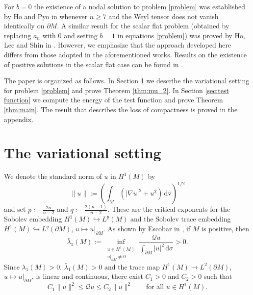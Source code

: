 \documentclass[reqno,11pt,oneside]{amsart}
\numberwithin{equation}{section}
\def\im{\int_{M}}
\def\idm{\int_{\partial M}}
\def\d{\,\mathrm{d}}
\def\dv{\,\mathrm{dv}}
\begin{document}
For $b=0$ the existence of a nodal solution to problem \eqref{problem} was established by Ho and Pyo in \cite[Theorems 1.3,  1.5 and 1.6]{hp} whenever $n\geq 7$ and the Weyl tensor does not vanish identically on $\partial M$. A similar result for the scalar flat problem (obtained by replacing $a_n$ with $0$ and setting $b=1$ in equations \eqref{problem}) was proved by Ho, Lee and Shin in \cite[Theorems 3.1, 5.2 and 6.1]{hls}. However, we emphasize that the approach developed here differs from those adopted in the aforementioned works. Results on the existence of positive solutions in the scalar flat case can be found in \cite{e2,mn}.

The paper is organized as follows. In Section \ref{sec:setting} we describe the variational setting for problem \eqref{problem} and prove Theorem \ref{thm:mu_2}. In Section \ref{sec:test function} we compute the energy of the test function and prove Theorem \ref{thm:main}. The result that describes the loss of compactness is proved in the appendix.

\section{The variational setting}
\label{sec:setting}

We denote the standard norm of $u$ in $H^1(M)$ by
$$\|u\|:=\left(\im(|\nabla u|^2+u^2)\dv\right)^{1/2}$$
and set $p:=\frac{2n}{n-2}$ and $q:=\frac{2(n-1)}{n-2}$. These are the critical exponents for the Sobolev embedding $H^1(M)\hookrightarrow L^p(M)$ and the Sobolev trace embedding $H^1(M)\hookrightarrow L^q(\partial M)$, $u\mapsto u|_{\partial M}$. As shown by Escobar in \cite[Section 1]{e2}, if $M$ is positive, then
\begin{equation}\label{eq:escobar1}
\bar{\lambda}_1(M):=\inf_{\substack{u\in H^1(M) \\ u|_{\partial M}\neq 0}}\frac{\mathscr{Q}u}{\idm |u|^2\d \sigma}>0.
\end{equation}
Since $\lambda_1(M)>0$, $\bar{\lambda}_1(M)>0$ and the trace map $H^1(M)\to L^2(\partial M)$, $u\mapsto u|_{\partial M}$, is linear and continuous, there exist $C_1>0$ and $C_2>0$ such that
\begin{equation} \label{eq:Q_norm}
C_1\|u\|^2 \leq \mathscr{Q}u \leq C_2\|u\|^2\qquad\text{for all \ }u\in H^1(M).
\end{equation}
\end{document}

